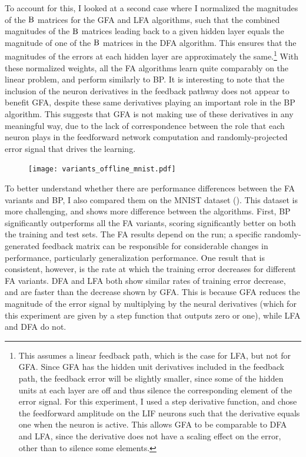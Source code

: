 To account for this, I looked at a second case where
I normalized the magnitudes of the $\mathrm{B}$ matrices for the GFA and LFA algorithms,
such that the combined magnitudes of the $\mathrm{B}$ matrices
leading back to a given hidden layer
equals the magnitude of one of the $\mathrm{B}$ matrices in the DFA algorithm.
This ensures that the magnitudes of the errors at each hidden layer
are approximately the same.\footnote{
  This assumes a linear feedback path, which is the case for LFA,
  but not for GFA.
  Since GFA has the hidden unit derivatives included in the feedback path,
  the feedback error will be slightly smaller,
  since some of the hidden units at each layer are off and thus silence
  the corresponding element of the error signal.
  For this experiment, I used a step derivative function,
  and chose the feedforward amplitude on the LIF neurons
  such that the derivative equals one when the neuron is active.
  This allows GFA to be comparable to DFA and LFA,
  since the derivative does not have a scaling effect on the error,
  other than to silence some elements.}
With these normalized weights,
all the FA algorithms learn quite comparably on the linear problem,
and perform similarly to BP.
It is interesting to note that the inclusion of the neuron derivatives
in the feedback pathway does not appear to benefit GFA,
despite these same derivatives playing an important role in the BP algorithm.
This suggests that GFA is not making use of these derivatives in any
meaningful way,
due to the lack of correspondence between
the role that each neuron plays in the feedforward network computation
and randomly-projected error signal that drives the learning.


\begin{figure}
  \centering
  \texttt{[image: variants\_offline\_mnist.pdf]}
\end{figure}

To better understand whether there are performance differences
between the FA variants and BP,
I also compared them on the MNIST dataset ().
This dataset is more challenging,
and shows more difference between the algorithms.
First, BP significantly outperforms all the FA variants,
scoring significantly better on both the training and test sets.
The FA results depend on the run;
a specific randomly-generated feedback matrix can be responsible
for considerable changes in performance,
particularly generalization performance.
One result that is consistent, however,
is the rate at which the training error decreases for different FA variants.
DFA and LFA both show similar rates of training error decrease,
and are faster than the decrease shown by GFA.
This is because GFA reduces the magnitude of the error signal
by multiplying by the neural derivatives
(which for this experiment are given by a step function that outputs zero or one),
while LFA and DFA do not.


